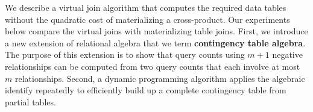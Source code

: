 \documentclass{vldb}
\begin{document}
We describe a virtual join algorithm that computes the required data tables without the quadratic cost of materializing a cross-product. Our experiments below compare the virtual joins with materializing table joins. 
First, we introduce a new extension of relational algebra that we term \textbf{contingency table algebra}. The purpose of this extension is to 
show that query counts using $m+1$ negative relationships can be computed from two query counts that each involve at most $m$ relationships. 
Second, a dynamic programming algorithm applies the algebraic identify repeatedly to efficiently build up a complete contingency table from partial tables.




%
\end{document}
